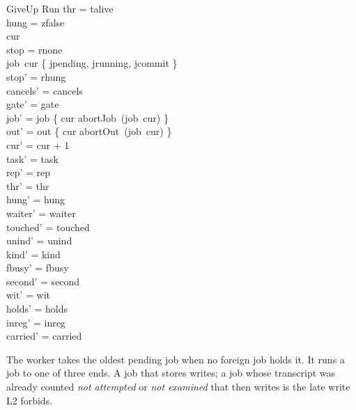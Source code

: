 \documentclass[a4paper,10pt,fleqn]{article}
\begin{document}
\begin{schema}{GiveUp}
\Delta Run
\where
thr = talive \\
hung = zfalse \\
cur   \\
stop = rnone \\
job~cur \in \{ jpending, jrunning, jcommit \} \\
stop' = rhung \\
cancels' = cancels \\
gate' = gate \\
job' = job \oplus \{ cur \mapsto abortJob~(job~cur) \} \\
out' = out \oplus \{ cur \mapsto abortOut~(job~cur) \} \\
cur' = cur + 1 \\
task' = task \\
rep' = rep \\
thr' = thr \\
hung' = hung \\
waiter' = waiter \\
touched' = touched \\
unind' = unind \\
kind' = kind \\
fbusy' = fbusy \\
second' = second \\
wit' = wit \\
holds' = holds \\
inreg' = inreg \\
carried' = carried
\end{schema}

The worker takes the oldest pending job when no foreign job holds it. It runs a
job to one of three ends. A job that stores writes; a job whose transcript was
already counted \emph{not attempted} or \emph{not examined} that then writes is
the late write L2 forbids.
\end{document}
